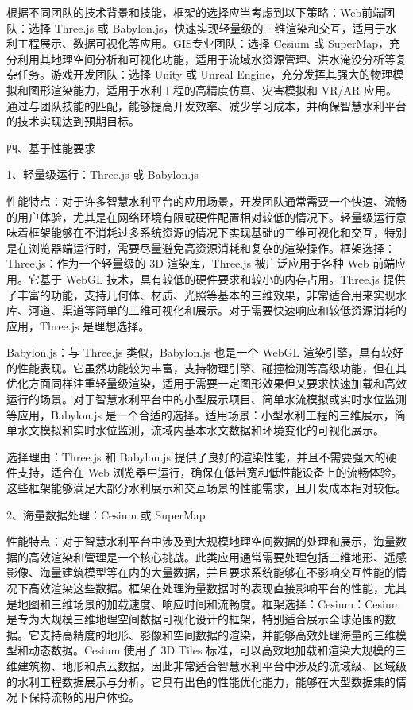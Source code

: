 根据不同团队的技术背景和技能，框架的选择应当考虑到以下策略：Web前端团队：选择 Three.js 或 Babylon.js，快速实现轻量级的三维渲染和交互，适用于水利工程展示、数据可视化等应用。GIS专业团队：选择 Cesium 或 SuperMap，充分利用其地理空间分析和可视化功能，适用于流域水资源管理、洪水淹没分析等复杂任务。游戏开发团队：选择 Unity 或 Unreal Engine，充分发挥其强大的物理模拟和图形渲染能力，适用于水利工程的高精度仿真、灾害模拟和 VR/AR 应用。通过与团队技能的匹配，能够提高开发效率、减少学习成本，并确保智慧水利平台的技术实现达到预期目标。

四、基于性能要求

1、轻量级运行：Three.js 或 Babylon.js

性能特点：对于许多智慧水利平台的应用场景，开发团队通常需要一个快速、流畅的用户体验，尤其是在网络环境有限或硬件配置相对较低的情况下。轻量级运行意味着框架能够在不消耗过多系统资源的情况下实现基础的三维可视化和交互，特别是在浏览器端运行时，需要尽量避免高资源消耗和复杂的渲染操作。框架选择：Three.js：作为一个轻量级的 3D 渲染库，Three.js 被广泛应用于各种 Web 前端应用。它基于 WebGL 技术，具有较低的硬件要求和较小的内存占用。Three.js 提供了丰富的功能，支持几何体、材质、光照等基本的三维效果，非常适合用来实现水库、河道、渠道等简单的三维可视化和展示。对于需要快速响应和较低资源消耗的应用，Three.js 是理想选择。

Babylon.js：与 Three.js 类似，Babylon.js 也是一个 WebGL 渲染引擎，具有较好的性能表现。它虽然功能较为丰富，支持物理引擎、碰撞检测等高级功能，但在其优化方面同样注重轻量级渲染，适用于需要一定图形效果但又要求快速加载和高效运行的场景。对于智慧水利平台中的小型展示项目、简单水流模拟或实时水位监测等应用，Babylon.js 是一个合适的选择。适用场景：小型水利工程的三维展示，简单水文模拟和实时水位监测，流域内基本水文数据和环境变化的可视化展示。

选择理由：Three.js 和 Babylon.js 提供了良好的渲染性能，并且不需要强大的硬件支持，适合在 Web 浏览器中运行，确保在低带宽和低性能设备上的流畅体验。这些框架能够满足大部分水利展示和交互场景的性能需求，且开发成本相对较低。

2、海量数据处理：Cesium 或 SuperMap

性能特点：对于智慧水利平台中涉及到大规模地理空间数据的处理和展示，海量数据的高效渲染和管理是一个核心挑战。此类应用通常需要处理包括三维地形、遥感影像、海量建筑模型等在内的大量数据，并且要求系统能够在不影响交互性能的情况下高效渲染这些数据。框架在处理海量数据时的表现直接影响平台的性能，尤其是地图和三维场景的加载速度、响应时间和流畅度。框架选择：Cesium：Cesium 是专为大规模三维地理空间数据可视化设计的框架，特别适合展示全球范围的数据。它支持高精度的地形、影像和空间数据的渲染，并能够高效处理海量的三维模型和动态数据。Cesium 使用了 3D Tiles 标准，可以高效地加载和渲染大规模的三维建筑物、地形和点云数据，因此非常适合智慧水利平台中涉及的流域级、区域级的水利工程数据展示与分析。它具有出色的性能优化能力，能够在大型数据集的情况下保持流畅的用户体验。

